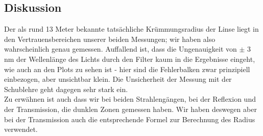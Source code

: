 \documentclass{article}
\begin{document}
\subsection{Diskussion}
Der als rund 13 Meter bekannte tatsächliche Krümmungsradius der Linse liegt in den Vertrauensbereichen unserer beiden Messungen; wir haben also wahrscheinlich genau gemessen. Auffallend ist, dass die Ungenauigkeit von $\pm$ 3 nm der Wellenlänge des Lichts durch den Filter kaum in die Ergebnisse eingeht, wie auch an den Plots zu sehen ist - hier sind die Fehlerbalken zwar prinzipiell einbezogen, aber unsichtbar klein. Die Unsicherheit der Messung mit der Schublehre geht dagegen sehr stark ein.\\
Zu erwähnen ist auch dass wir bei beiden Strahlengängen, bei der Reflexion und der Transmission, die dunklen Zonen gemessen haben. Wir haben deswegen aber bei der Transmission auch die entsprechende Formel zur Berechnung des Radius verwendet.
\end{document}

